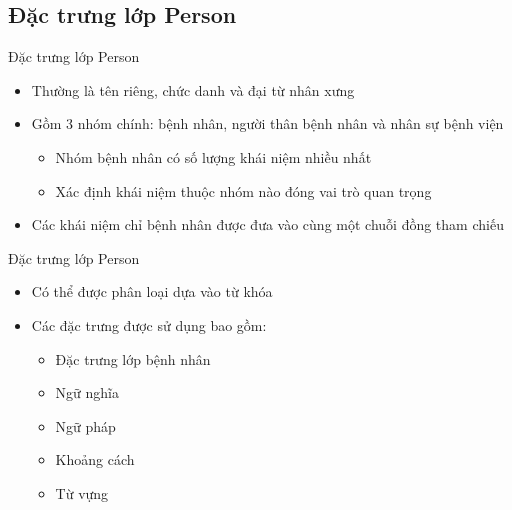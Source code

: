 \subsection{Đặc trưng lớp Person}
\begin{frame}{Đặc trưng lớp Person}
\putlogo
\begin{itemize}
	\item Thường là tên riêng, chức danh và đại từ nhân xưng
	\item Gồm 3 nhóm chính: bệnh nhân, người thân bệnh nhân và nhân sự bệnh viện
	\begin{itemize}
		\item Nhóm bệnh nhân có số lượng khái niệm nhiều nhất
		\item Xác định khái niệm thuộc nhóm nào đóng vai trò quan trọng
	\end{itemize}
	\item Các khái niệm chỉ bệnh nhân được đưa vào cùng một chuỗi đồng tham chiếu
\end{itemize}
\end{frame}

\begin{frame}{Đặc trưng lớp Person}
\begin{itemize}
	\item Có thể được phân loại dựa vào {\color{red} từ khóa}
	\item Các đặc trưng được sử dụng bao gồm:
	\begin{itemize}
		\item Đặc trưng lớp bệnh nhân
		\item Ngữ nghĩa
		\item Ngữ pháp
		\item Khoảng cách
		\item Từ vựng
	\end{itemize}	
\end{itemize}
\end{frame}


